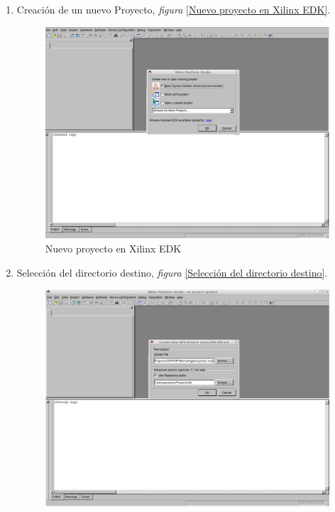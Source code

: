 \begin{enumerate}
 \item Creación de un nuevo Proyecto, \emph{figura} \ref{Nuevo proyecto en
Xilinx EDK}.
  \begin{figure}[h!] 
  \centering
  \includegraphics[scale=.25]{./figuras/EDK0.png}
  \caption{Nuevo proyecto en Xilinx EDK}
  \label{Nuevo proyecto en Xilinx EDK}
  \end{figure}
 \item Selección del directorio destino, \emph{figura} \ref{Selección del
directorio destino}.
  \begin{figure}[h!] 
  \centering
  \includegraphics[scale=.25]{./figuras/EDK1.png}

\end{figure}
\end{enumerate}
